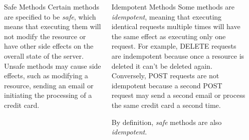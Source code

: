 \documentclass[final]{beamer}
\begin{document}
\begin{frame}{}
\begin{columns}
\begin{column}{0.9\textwidth}
        \begin{columns}
          \begin{column}{0.34\textwidth}
            \begin{block}{\huge{Safe Methods}}
              \Large
              Certain methods are specified to be \emph{safe}, which means that executing
              them will not modify the resource or have other side effects on the
              overall state of the server. Unsafe methods may cause side effects, such
              as modifying a resource, sending an email or initiating the processing of
              a credit card.
            \end{block}
          \end{column}
          \begin{column}{0.64\textwidth}
            \begin{block}{\huge{Idempotent Methods}}
              \Large
              Some methods are \emph{idempotent}, meaning that executing identical
              requests multiple times will have the same effect as executing only one
              request. For example, DELETE requests are indempotent because once a
              resource is deleted it can't be deleted again. Conversely, POST requests
              are not idempotent because a second POST request may send a second email
              or process the same credit card a second time.

              By definition, \emph{safe} methods are also \emph{idempotent}.
            \end{block}
          \end{column}
        \end{columns}

      \end{column}
      \begin{column}{0.05\textwidth}
      \end{column}
    \end{columns}

  \end{frame}
\end{document}
